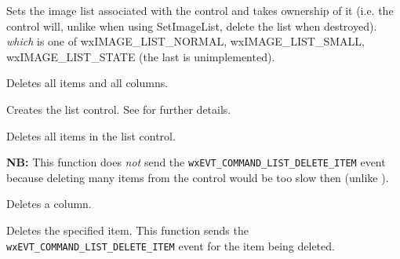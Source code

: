\label{wxlistctrlassignimagelist}


Sets the image list associated with the control and
takes ownership of it (i.e. the control will, unlike when using
SetImageList, delete the list when destroyed). {\it which} is one of
wxIMAGE\_LIST\_NORMAL, wxIMAGE\_LIST\_SMALL, wxIMAGE\_LIST\_STATE (the last is unimplemented).




\label{wxlistctrlclearall}


Deletes all items and all columns.


\label{wxlistctrlcreate}


Creates the list control. See  for further details.


\label{wxlistctrldeleteallitems}


Deletes all items in the list control.

{\bf NB:} This function does {\it not} send the
{\tt wxEVT\_COMMAND\_LIST\_DELETE\_ITEM} event because deleting many items
from the control would be too slow then (unlike ).


\label{wxlistctrldeletecolumn}


Deletes a column.


\label{wxlistctrldeleteitem}


Deletes the specified item. This function sends the
{\tt wxEVT\_COMMAND\_LIST\_DELETE\_ITEM} event for the item being deleted.

